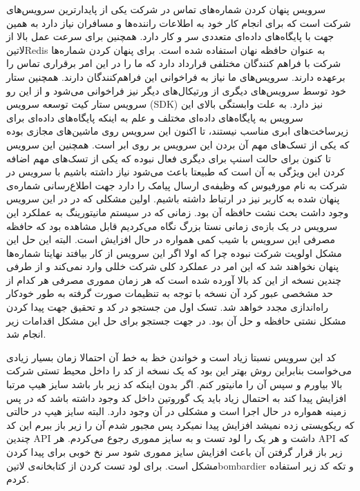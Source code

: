 \documentclass[a4]{report}
\begin{document}
سرویس پنهان کردن شماره‌های تماس در شرکت یکی از پایدارترین سرویس‌های شرکت است
که برای انجام کار خود به اطلاعات راننده‌ها و مسافران نیاز دارد
به همین جهت با پایگاه‌های داده‌ای متعددی سر و کار دارد.
همچنین برای سرعت عمل بالا از ‌لاتین{Redis} به عنوان حافظه نهان استفاده شده است.
برای پنهان کردن شماره‌ها شرکت با فراهم کنندگان مختلفی قرارداد دارد که ما را در این امر برقراری تماس را برعهده دارند.
سرویس‌های ما نیاز به فراخوانی این فراهم‌کنندگان دارند.
همچنین ستار خود توسط سرویس‌های دیگری از ورتیکال‌های دیگر نیز فراخوانی می‌شود و از این رو سرویس ستار
کیت توسعه سرویس (SDK) نیز دارد.
به علت وابستگی بالای این سرویس به پایگاه‌های داده‌ای مختلف و علم به اینکه پایگاه‌های داده‌ای
برای زیرساخت‌های ابری مناسب نیستند، تا اکنون این سرویس روی ماشین‌های مجازی بوده که یکی از تسک‌های مهم آن بردن این سرویس بر روی ابر است.
همچنین این سرویس تا کنون برای حالت اسنپ برای دیگری فعال نبوده که یکی از تسک‌های مهم اضافه کردن این ویژگی به آن است که طبیعتا باعث
می‌شود نیاز داشته باشیم با سرویس در شرکت به نام مورفیوس که وظیفه‌ی ارسال پیامک را دارد جهت اطلاع‌رسانی شماره‌ی پنهان شده به کاربر نیز در ارتباط داشته باشیم.
اولین مشکلی که در در این سرویس وجود داشت بحث نشت حافظه آن بود.
زمانی که در سیستم مانیتورینگ به عملکرد این سرویس در یک بازه‌ی زمانی نستا بزرگ نگاه می‌کردیم قابل مشاهده بود که حافظه مصرفی این سرویس با شیب کمی همواره در حال
افزایش است.
البته این حل این مشکل اولویت شرکت نبوده چرا که اولا اگر این سرویس از کار بیافتد نهایتا شماره‌ها پنهان نخواهند شد
که این امر در عملکرد کلی شرکت خللی وارد نمی‌کند و از طرفی چندین نسخه از این کد بالا آورده شده است که هر زمان مموری مصرفی هر کدام از حد مشخصی عبور کرد
آن نسخه با توجه به تنظیمات صورت گرفته به طور خودکار راه‌اندازی مجدد خواهد شد.
تسک اول من جستجو در کد و تحقیق جهت پیدا کردن مشکل نشتی حافظه و حل آن بود.
در جهت جستجو برای حل این مشکل اقدامات زیر انجام شد.

کد این سرویس نسبتا زیاد است و خواندن خظ به خط آن احتمالا زمان بسیار زیادی می‌خواست بنابراین روش بهتر این بود که یک نسخه از کد را داخل محیط تستی شرکت بالا بیاورم و
سپس آن را مانیتور کنم. اگر بدون اینکه کد زیر بار باشد سایز هیپ مرتبا افزایش پیدا کند به احتمال زیاد باید یک گوروتین داخل کد وجود داشته باشد
که در پس زمینه همواره در حال اجرا است و مشکلی در آن وجود دارد.
البته سایز هیپ در حالتی که ریکويستی زده نمیشد افزایش پیدا نمیکرد پس مجبور شدم آن را زیر باز ببرم این کد چندین API داشت و هر یک را لود تست و به سایز مموری رجوع می‌کردم.
هر API که زیر باز قرار گرفتن آن باعث افزایش سایز مموری شود سر نخ خوبی برای پیدا کردن مشکل است.
برای لود تست کردن از کتابخانه‌ی ‌لاتین{bombardier} و تکه کد زیر استفاده کردم.
\end{document}
